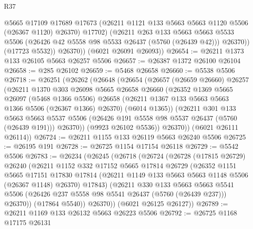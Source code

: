\begin{lexlean}{R37}
\begin{coremodule}
                @5665
                @17109
                @17689
                @17673
                (@26211 @1121 @133 @5663 @5663 @1120 @5506 (@26367 @1120) @26370)
                @17702)
              (@26211
                @263
                @133
                @5663
                @5663
                @5533
                @5506
                (@26426 @42 @5558 @98 @5533 @26437 (@5760 (@26439 @42)))
                @26370))
            (@17723 @5532))
          @26370))
      (@6021 @26091 @26093))
@26654 := @26211 @1373 @133 @26105 @5663 @26257 @5506
@26657 := @26387 @1372 @26100 @26104
@26658 := @285 @26102
@26659 := @5468 @26658
@26660 := @5538 @5506
@26718 := @26251
    (@26262
      (@26648
        (@26654
          (@26657
            (@26659 @26660)
            @26257
            (@26211
              @1370
              @303
              @26098
              @5665
              @26658
              @26660
              (@26352
                @1369
                @5665
                @26097
                (@5468 @1366 @5506)
                @26658
                (@26211 @1367 @133 @5663 @5663 @1366 @5506 (@26367 @1366) @26370)
                (@6014 @1365))
              (@26211
                @301
                @133
                @5663
                @5663
                @5537
                @5506
                (@26426 @191 @5558 @98 @5537 @26437 (@5760 (@26439 @191)))
                @26370))
            (@9923 @26102 @5536))
          @26370))
      (@6021 @26111 @26114))
@26724 := @26211 @1155 @133 @26119 @5663 @26240 @5506
@26725 := @26195 @191
@26728 := @26725 @1154 @17154 @26118
@26729 := @5542 @5506
@26783 := @26234
    (@26245
      (@26718
        (@26724
          (@26728
            (@17815 @26729)
            @26240
            (@26211
              @1152
              @332
              @17152
              @5665
              @17814
              @26729
              (@26352
                @1151
                @5665
                @17151
                @17830
                @17814
                (@26211 @1149 @133 @5663 @5663 @1148 @5506 (@26367 @1148) @26370)
                @17843)
              (@26211
                @330
                @133
                @5663
                @5663
                @5541
                @5506
                (@26426 @237 @5558 @98 @5541 @26437 (@5760 (@26439 @237)))
                @26370))
            (@17864 @5540))
          @26370))
      (@6021 @26125 @26127))
@26789 := @26211 @1169 @133 @26132 @5663 @26223 @5506
@26792 := @26725 @1168 @17175 @26131

\end{coremodule}
\end{lexlean}
